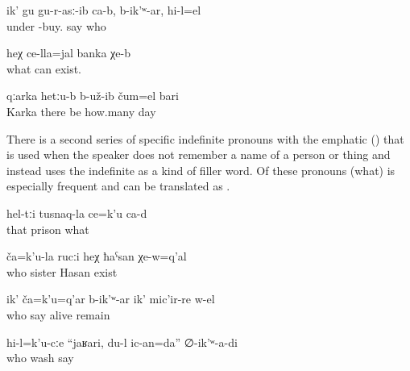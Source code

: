 \begin{exe}
	\ex	\label{ex:Someone bought it down (= the area around the village of Sanzhi), they say}
	\gll	ik'	gu	gu-r-asː-ib ca-b,	b-ik'ʷ-ar,	hi-l=el\\
			under	-buy. 	say	who\\
	\glt	{}

	\ex	\label{ex:There down is a can of something}
	\gll	heχ	ce-lla=jal	banka	χe-b\\
			what	can	exist.\\
	\glt	{}

	\ex	\label{ex:In Karka the bandits stayed for some days.}
	\gll	qːarka	hetːu-b	b-už-ib	čum=el	bari\\
		Karka	there	be	how.many	day\\
	\glt	{}
\end{exe}

There is a second series of specific indefinite pronouns with the emphatic   () that is used when the speaker does not remember a name of a person or thing and instead uses the indefinite as a kind of filler word. Of these pronouns  (what) is especially frequent and can be translated as . 

\begin{exe}
	\ex	\label{ex:These are the prison's whatchamacallits}
	\gll	hel-tːi	tusnaq-la	ce=k'u	ca-d\\
		that	prison	what	\\
	\glt	{}

	\ex	\label{ex:This one his sister, that Hasan who lives down there}
	\gll	ča=k'u-la	rucːi	heχ	ħaˁsan	χe-w=q'al\\
		who	sister		Hasan	exist\\
	\glt	{}

	\ex	\label{ex:This one, how is he called, he is still alive}
	\gll	ik'	ča=k'u=q'ar	b-ik'ʷ-ar	ik'	mic'ir-re	w-el\\
			who	say		alive	remain\\
	\glt	{}

	\ex	\label{ex:To someone I (masc.) said, well I will wash him}
	\gll	hi-l=k'u-cːe	``jaʁari,	du-l	ic-an=da''	∅-ik'ʷ-a-di\\
		who			wash	say\\
	\glt	{}
\end{exe}



